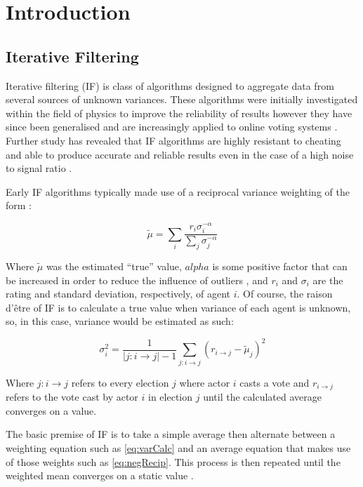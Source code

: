 
\chapter{Introduction} %

\section{Iterative Filtering}\label{sec:IFBack}
Iterative filtering (IF) is class of algorithms designed to aggregate data from several sources of unknown variances. These algorithms were initially investigated within the field of physics to improve the reliability of results however they have since been generalised and are increasingly applied to online voting systems \cite{laureti2006information}. Further study has revealed that IF algorithms are highly resistant to cheating and able to produce accurate and reliable results even in the case of a high noise to signal ratio \cite{juselius2014testing}.

Early IF algorithms typically made use of a reciprocal variance weighting of the form \cite{laureti2006information, de2007iterative, de2010iterative}:

\begin{equation}
    \tilde{\mu} = \sum\limits_i\frac{r_i\sigma_i^{-\alpha}}{\sum\limits_j \sigma_j^{-\alpha}} \label{eq:negRecip}
\end{equation}

Where $\tilde{\mu}$ was the estimated ``true'' value, $alpha$ is some positive factor that can be increased in order to reduce the influence of outliers \cite{ifNotes4121}, and $r_i$ and $\sigma_i$ are the rating and standard deviation, respectively, of agent $i$. Of course, the raison d'\^etre of IF is to calculate a true value when variance of each agent is unknown, so, in this case, variance would be estimated as such:

\begin{equation}
\sigma_i^2 = \frac{1}{|j:i\rightarrow j| - 1}\sum\limits_{j:i\rightarrow j}(r_{i\rightarrow j} - \tilde{\mu}_j)^2 \label{eq:varCalc}
\end{equation}

Where $j:i\rightarrow j$ refers to every election $j$ where actor $i$ casts a vote and $r_{i\rightarrow j}$ refers to the vote cast by actor $i$ in election $j$ until the calculated average converges on a value.

The basic premise of IF is to take a simple average then alternate between a weighting equation such as \ref{eq:varCalc} and an average equation that makes use of those weights such as \ref{eq:negRecip}. This process is then repeated until the weighted mean converges on a static value \cite{laureti2006information}.

